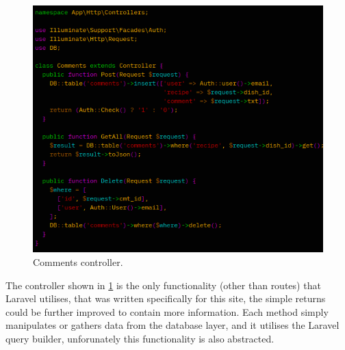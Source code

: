 \documentclass[a4paper]{scrartcl}
\begin{document}
\begin{figure}[H]
  \begin{center}
    \includegraphics[scale=1.0]{images/db.png}
    \caption{Comments controller.}
    \label{fig:comments}
  \end{center}
\end{figure}
\noindent
The controller shown in \ref{fig:comments} is the only functionality (other than routes)
that Laravel utilises, that was written specifically for this site, the simple returns
could be further improved to contain more information. Each method simply manipulates or
gathers data from the database layer, and it utilises the Laravel query builder,
unforunately this functionality is also abstracted.
\newpage
\end{document}
